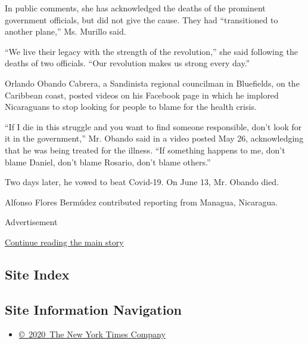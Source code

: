 In public comments, she has acknowledged the deaths of the prominent
government officials, but did not give the cause. They had
``transitioned to another plane,'' Ms. Murillo said.

``We live their legacy with the strength of the revolution,'' she said
following the deaths of two officials. ``Our revolution makes us strong
every day.''

Orlando Obando Cabrera, a Sandinista regional councilman in Bluefields,
on the Caribbean coast, posted videos on his Facebook page in which he
implored Nicaraguans to stop looking for people to blame for the health
crisis.

``If I die in this struggle and you want to find someone responsible,
don't look for it in the government,'' Mr. Obando said in a video posted
May 26, acknowledging that he was being treated for the illness. ``If
something happens to me, don't blame Daniel, don't blame Rosario, don't
blame others.''

Two days later, he vowed to beat Covid-19. On June 13, Mr. Obando died.

Alfonso Flores Bermúdez contributed reporting from Managua, Nicaragua.

Advertisement

\protect\hyperlink{after-bottom}{Continue reading the main story}

\hypertarget{site-index}{%
\subsection{Site Index}\label{site-index}}

\hypertarget{site-information-navigation}{%
\subsection{Site Information
Navigation}\label{site-information-navigation}}

\begin{itemize}
\tightlist
\item
  \href{https://help.nytimes3xbfgragh.onion/hc/en-us/articles/115014792127-Copyright-notice}{©~2020~The
  New York Times Company}
\end{itemize}

